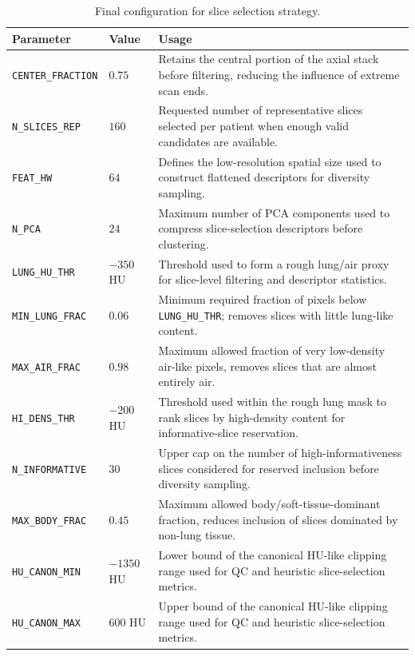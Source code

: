 \begin{table}[H]
\centering
\small
\caption{Final configuration for slice selection strategy.}
\label{tab:slice_selection_configuration}
\begin{tabular}{p{}p{}p{}}
\toprule
Parameter & Value & Usage \\
\midrule
\texttt{CENTER\_FRACTION} & \(0.75\) & Retains the central portion of the axial stack before filtering, reducing the influence of extreme scan ends. \\
\texttt{N\_SLICES\_REP} & \(160\) & Requested number of representative slices selected per patient when enough valid candidates are available. \\
\texttt{FEAT\_HW} & \(64\) & Defines the low-resolution spatial size used to construct flattened descriptors for diversity sampling. \\
\texttt{N\_PCA} & \(24\) & Maximum number of PCA components used to compress slice-selection descriptors before clustering. \\
\texttt{LUNG\_HU\_THR} & \(-350\) HU & Threshold used to form a rough lung/air proxy for slice-level filtering and descriptor statistics. \\
\texttt{MIN\_LUNG\_FRAC} & \(0.06\) & Minimum required fraction of pixels below \texttt{LUNG\_HU\_THR}; removes slices with little lung-like content. \\
\texttt{MAX\_AIR\_FRAC} & \(0.98\) & Maximum allowed fraction of very low-density air-like pixels, removes slices that are almost entirely air. \\
\texttt{HI\_DENS\_THR} & \(-200\) HU & Threshold used within the rough lung mask to rank slices by high-density content for informative-slice reservation. \\
\texttt{N\_INFORMATIVE} & \(30\) & Upper cap on the number of high-informativeness slices considered for reserved inclusion before diversity sampling. \\
\texttt{MAX\_BODY\_FRAC} & \(0.45\) & Maximum allowed body/soft-tissue-dominant fraction, reduces inclusion of slices dominated by non-lung tissue. \\
\texttt{HU\_CANON\_MIN} & \(-1350\) HU & Lower bound of the canonical HU-like clipping range used for QC and heuristic slice-selection metrics. \\
\texttt{HU\_CANON\_MAX} & \(600\) HU & Upper bound of the canonical HU-like clipping range used for QC and heuristic slice-selection metrics. \\
\bottomrule
\end{tabular}
\end{table}

